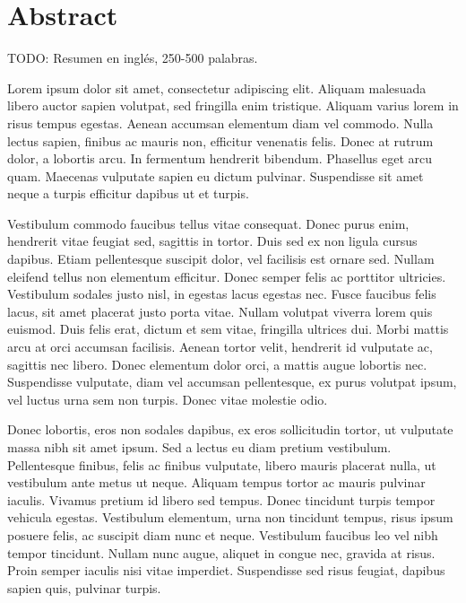 \chapter*{Abstract}

\begin{abstractEn}
TODO: Resumen en inglés, 250-500 palabras.

Lorem ipsum dolor sit amet, consectetur adipiscing elit. Aliquam malesuada libero auctor sapien volutpat, sed fringilla enim tristique. Aliquam varius lorem in risus tempus egestas. Aenean accumsan elementum diam vel commodo. Nulla lectus sapien, finibus ac mauris non, efficitur venenatis felis. Donec at rutrum dolor, a lobortis arcu. In fermentum hendrerit bibendum. Phasellus eget arcu quam. Maecenas vulputate sapien eu dictum pulvinar. Suspendisse sit amet neque a turpis efficitur dapibus ut et turpis.

Vestibulum commodo faucibus tellus vitae consequat. Donec purus enim, hendrerit vitae feugiat sed, sagittis in tortor. Duis sed ex non ligula cursus dapibus. Etiam pellentesque suscipit dolor, vel facilisis est ornare sed. Nullam eleifend tellus non elementum efficitur. Donec semper felis ac porttitor ultricies. Vestibulum sodales justo nisl, in egestas lacus egestas nec. Fusce faucibus felis lacus, sit amet placerat justo porta vitae. Nullam volutpat viverra lorem quis euismod. Duis felis erat, dictum et sem vitae, fringilla ultrices dui. Morbi mattis arcu at orci accumsan facilisis. Aenean tortor velit, hendrerit id vulputate ac, sagittis nec libero. Donec elementum dolor orci, a mattis augue lobortis nec. Suspendisse vulputate, diam vel accumsan pellentesque, ex purus volutpat ipsum, vel luctus urna sem non turpis. Donec vitae molestie odio.

Donec lobortis, eros non sodales dapibus, ex eros sollicitudin tortor, ut vulputate massa nibh sit amet ipsum. Sed a lectus eu diam pretium vestibulum. Pellentesque finibus, felis ac finibus vulputate, libero mauris placerat nulla, ut vestibulum ante metus ut neque. Aliquam tempus tortor ac mauris pulvinar iaculis. Vivamus pretium id libero sed tempus. Donec tincidunt turpis tempor vehicula egestas. Vestibulum elementum, urna non tincidunt tempus, risus ipsum posuere felis, ac suscipit diam nunc et neque. Vestibulum faucibus leo vel nibh tempor tincidunt. Nullam nunc augue, aliquet in congue nec, gravida at risus. Proin semper iaculis nisi vitae imperdiet. Suspendisse sed risus feugiat, dapibus sapien quis, pulvinar turpis.

\end{abstractEn}

